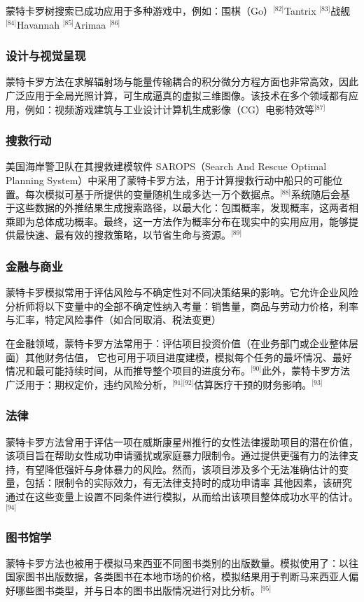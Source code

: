 蒙特卡罗树搜索已成功应用于多种游戏中，例如：围棋（Go）\(^\text{[82]}\)Tantrix \(^\text{[83]}\)战舰\(^\text{[84]}\)Havannah \(^\text{[85]}\)Arimaa \(^\text{[86]}\)
\subsubsection{设计与视觉呈现}
蒙特卡罗方法在求解辐射场与能量传输耦合的积分微分方程方面也非常高效，因此广泛应用于全局光照计算，可生成逼真的虚拟三维图像。该技术在多个领域都有应用，例如：视频游戏建筑与工业设计计算机生成影像（CG）电影特效等\(^\text{[87]}\)
\subsubsection{搜救行动}
美国海岸警卫队在其搜救建模软件 SAROPS（Search And Rescue Optimal Planning System）中采用了蒙特卡罗方法，用于计算搜救行动中船只的可能位置。每次模拟可基于所提供的变量随机生成多达一万个数据点。\(^\text{[88]}\)系统随后会基于这些数据的外推结果生成搜索路径，以最大化：包围概率，发现概率，这两者相乘即为总体成功概率。最终，这一方法作为概率分布在现实中的实用应用，能够提供最快速、最有效的搜救策略，以节省生命与资源。\(^\text{[89]}\)
\subsubsection{金融与商业}
蒙特卡罗模拟常用于评估风险与不确定性对不同决策结果的影响。它允许企业风险分析师将以下变量中的全部不确定性纳入考量：销售量，商品与劳动力价格，利率与汇率，特定风险事件（如合同取消、税法变更）

在金融领域，蒙特卡罗方法常用于：评估项目投资价值（在业务部门或企业整体层面）其他财务估值，
它也可用于项目进度建模，模拟每个任务的最坏情况、最好情况和最可能持续时间，从而推导整个项目的进度分布。\(^\text{[90]}\)此外，蒙特卡罗方法广泛用于：期权定价，违约风险分析，\(^\text{[91][92]}\)估算医疗干预的财务影响。\(^\text{[93]}\)
\subsubsection{法律}
蒙特卡罗方法曾用于评估一项在威斯康星州推行的女性法律援助项目的潜在价值，该项目旨在帮助女性成功申请骚扰或家庭暴力限制令。通过提供更强有力的法律支持，有望降低强奸与身体暴力的风险。然而，该项目涉及多个无法准确估计的变量，包括：限制令的实际效力，有无法律支持时的成功申请率
其他因素，该研究通过在这些变量上设置不同条件进行模拟，从而给出该项目整体成功水平的估计。\(^\text{[94]}\)
\subsubsection{图书馆学}
蒙特卡罗方法也被用于模拟马来西亚不同图书类别的出版数量。模拟使用了：以往国家图书出版数据，各类图书在本地市场的价格，模拟结果用于判断马来西亚人偏好哪些图书类型，并与日本的图书出版情况进行对比分析。\(^\text{[95]}\)
